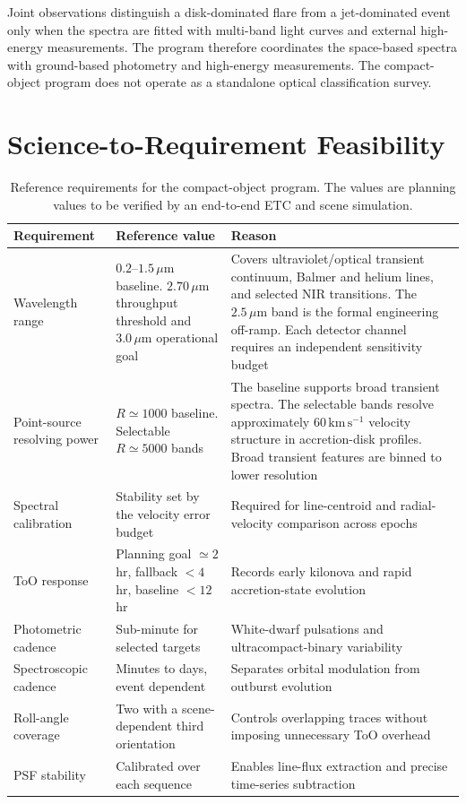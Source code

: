 \documentclass[10pt,onecolumn]{article}
\newcommand{\kms}{\mathrm{km\,s^{-1}}}
\newcommand{\micron}{\,\mu\mathrm{m}}
\begin{document}
Joint observations distinguish a disk-dominated flare from a jet-dominated
event only when the spectra are fitted with multi-band light curves and
external high-energy measurements. The program therefore coordinates the
space-based spectra with ground-based photometry and high-energy measurements.
The compact-object program does not operate as a standalone optical
classification survey.

\section{Science-to-Requirement Feasibility}

\begin{table}[H]
\centering
\caption{Reference requirements for the compact-object program. The values are
planning values to be verified by an end-to-end ETC and scene simulation.}
\label{tab:requirements}
\begin{tabularx}{\textwidth}{@{}P{43mm} P{30mm} Y@{}}
\toprule
\textbf{Requirement} & \textbf{Reference value} & \textbf{Reason}\\
\midrule
Wavelength range & $0.2$--$1.5\micron$ baseline. $2.70\micron$ throughput
threshold and $3.0\micron$ operational goal & Covers ultraviolet/optical
transient continuum, Balmer and helium lines, and selected NIR transitions.
The $2.5\micron$ band is the formal engineering off-ramp. Each detector
channel requires an independent sensitivity budget\\
Point-source resolving power & $R\simeq1000$ baseline. Selectable
$R\simeq5000$ bands & The baseline supports broad transient spectra. The
selectable bands resolve approximately $60\,\kms$ velocity structure in
accretion-disk profiles. Broad transient features are binned to lower
resolution\\
Spectral calibration & Stability set by the velocity error budget & Required
for line-centroid and radial-velocity comparison across epochs\\
ToO response & Planning goal $\simeq2$ hr, fallback $<4$ hr, baseline
$<12$ hr & Records early kilonova and rapid accretion-state evolution\\
Photometric cadence & Sub-minute for selected targets & White-dwarf
pulsations and ultracompact-binary variability\\
Spectroscopic cadence & Minutes to days, event dependent & Separates orbital
modulation from outburst evolution\\
Roll-angle coverage & Two with a scene-dependent third orientation & Controls
overlapping traces without imposing unnecessary ToO overhead\\
PSF stability & Calibrated over each sequence & Enables line-flux extraction
and precise time-series subtraction\\
\bottomrule
\end{tabularx}
\end{table}
\end{document}
